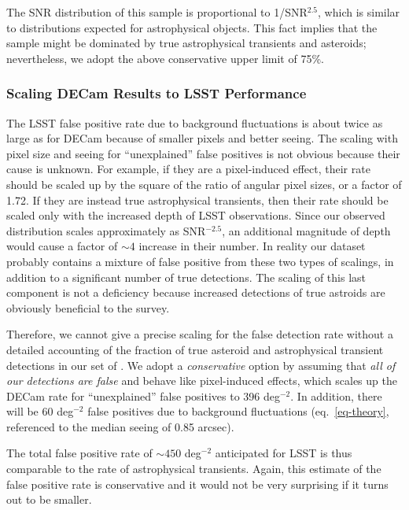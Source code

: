 The SNR distribution of this sample is proportional to 1/SNR$^{2.5}$, which
is similar to distributions expected for astrophysical objects. This fact implies
that the sample might be dominated by true astrophysical transients and
asteroids; nevertheless, we adopt the above conservative upper limit of 75\%.

\subsubsection{Scaling DECam Results to LSST Performance}

The LSST false positive rate due to background fluctuations is about twice
as large as for DECam because of smaller pixels and better seeing. The scaling
with pixel size and seeing for ``unexplained'' false positives is not obvious
because their cause is unknown. For example, if they are a pixel-induced effect,
their rate should be scaled up by the square of the ratio of angular pixel sizes, or
a factor of 1.72. If they are instead true astrophysical transients,
then their rate should be scaled only with the increased depth of LSST
observations. Since our observed \DIASource distribution scales approximately as
SNR$^{-2.5}$, an additional magnitude of depth would cause a factor of $\sim 4$
increase in their number. In reality our dataset probably contains a mixture of
false positive from these two types of scalings, in addition to a significant
number of true detections. The scaling of this last component is not a deficiency
because increased detections of true astroids are obviously beneficial to the survey.

Therefore, we cannot give a precise scaling for the false detection rate without a 
detailed accounting of the fraction of true asteroid and astrophysical transient 
detections in our set of \DIASources. We adopt a {\it conservative} option by assuming
that {\it all of our detections are false} and behave like pixel-induced effects, which 
scales up the DECam rate for ``unexplained'' false positives to 396 deg$^{-2}$. In addition, 
there will be 60 deg$^{-2}$ false positives due to background fluctuations (eq.~\ref{eq-theory}, 
referenced to the median seeing of 0.85 arcsec).

The total false positive rate of $\sim450$ deg$^{-2}$ anticipated for LSST is thus
comparable to the rate of astrophysical transients. Again, this estimate of the false
positive rate is conservative and it would not be very surprising if it turns out
to be smaller.

